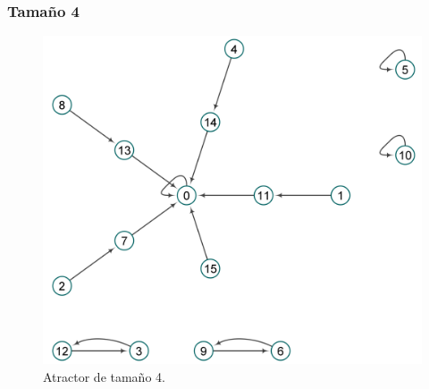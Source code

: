 \documentclass[11pt]{article}
\begin{document}
			\subsubsection{Tamaño 4}
			\begin{figure}[H]
			\centering
			\includegraphics[scale=0.1]{resources/Atractores22/atractor_22_size_4.png}
			\caption{Atractor de tamaño 4.}\label{fig:picture}
			\end{figure}
\end{document}
